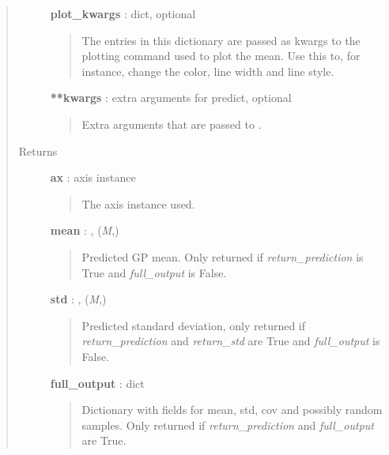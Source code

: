 \documentclass[letterpaper,10pt,english]{sphinxmanual}
\begin{document}
\begin{fulllineitems}
\begin{fulllineitems}
\begin{quote}
\begin{description}
\begin{quote}
\begin{quote}
\end{quote}
\end{quote}

\textbf{plot\_kwargs} : dict, optional
\begin{quote}

The entries in this dictionary are passed as kwargs to the plotting
command used to plot the mean. Use this to, for instance, change the
color, line width and line style.
\end{quote}

\textbf{**kwargs} : extra arguments for predict, optional
\begin{quote}

Extra arguments that are passed to {\hyperref[gptools:gptools.gaussian_process.GaussianProcess.predict]{}}.
\end{quote}

\item[{Returns}] \leavevmode
\textbf{ax} : axis instance
\begin{quote}

The axis instance used.
\end{quote}

\textbf{mean} : , (\emph{M},)
\begin{quote}

Predicted GP mean. Only returned if \emph{return\_prediction} is True and \emph{full\_output} is False.
\end{quote}

\textbf{std} : , (\emph{M},)
\begin{quote}

Predicted standard deviation, only returned if \emph{return\_prediction} and \emph{return\_std} are True and \emph{full\_output} is False.
\end{quote}

\textbf{full\_output} : dict
\begin{quote}

Dictionary with fields for mean, std, cov and possibly random samples. Only returned if \emph{return\_prediction} and \emph{full\_output} are True.
\end{quote}

\end{description}\end{quote}

\end{fulllineitems}



\end{fulllineitems}
\end{document}
